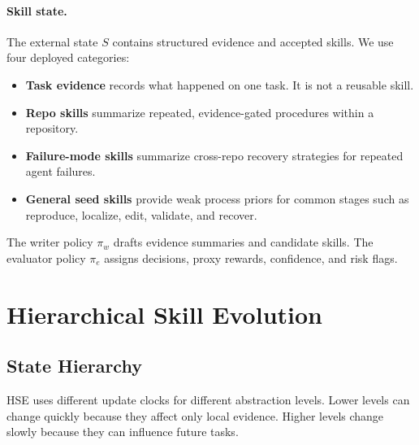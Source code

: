 \documentclass{article}
\newcommand{\method}{HSE}
\begin{document}
\paragraph{Skill state.}
The external state $S$ contains structured evidence and accepted skills. We use
four deployed categories:
\begin{itemize}
    \item \textbf{Task evidence} records what happened on one task. It is not a
    reusable skill.
    \item \textbf{Repo skills} summarize repeated, evidence-gated procedures
    within a repository.
    \item \textbf{Failure-mode skills} summarize cross-repo recovery strategies
    for repeated agent failures.
    \item \textbf{General seed skills} provide weak process priors for common
    stages such as reproduce, localize, edit, validate, and recover.
\end{itemize}
The writer policy $\pi_w$ drafts evidence summaries and candidate skills. The
evaluator policy $\pi_e$ assigns decisions, proxy rewards, confidence, and risk
flags.

\section{Hierarchical Skill Evolution}

\subsection{State Hierarchy}

\method{} uses different update clocks for different abstraction levels. Lower
levels can change quickly because they affect only local evidence. Higher levels
change slowly because they can influence future tasks.
\end{document}
